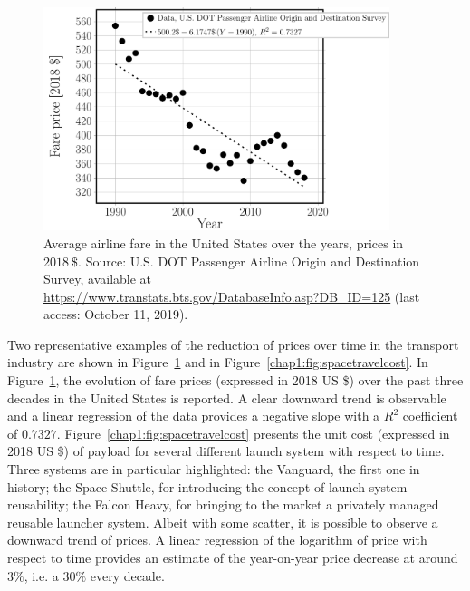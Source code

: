 \begin{description}
\begin{figure}[!h]
\includegraphics[width=0.9\textwidth]{pics/airlinefarecost.pdf}
\caption{Average airline fare in the United States over the years, prices in $2018\ \$$. Source: U.S. DOT Passenger Airline Origin and Destination Survey, available at \href{https://www.transtats.bts.gov/DatabaseInfo.asp?DB\_ID=125}{https://www.transtats.bts.gov/DatabaseInfo.asp?DB\_ID=125} (last access: October 11, 2019).}\label{chap1:fig:airlinefarecost}
\end{figure}

Two representative examples of the reduction of prices over time in the transport industry are shown in Figure~\ref{chap1:fig:airlinefarecost} and in Figure~\ref{chap1:fig:spacetravelcost}. In Figure~\ref{chap1:fig:airlinefarecost}, the evolution of fare prices (expressed in 2018 US \$) over the past three decades in the United States is reported. A clear downward trend is observable and a linear regression of the data provides a negative slope with a $R^{2}$ coefficient of $0.7327$. Figure~\ref{chap1:fig:spacetravelcost} presents the unit cost (expressed in 2018 US \$) of payload for several different launch system with respect to time. Three systems are in particular highlighted: the Vanguard, the first one in history; the Space Shuttle, for introducing the concept of launch system reusability; the Falcon Heavy, for bringing to the market a privately managed reusable launcher system. Albeit with some scatter, it is possible to observe a downward trend of prices. A linear regression of the logarithm of price with respect to time provides an estimate of the year-on-year price decrease at around $3\%$, i.e. a $30\%$ every decade.


\end{description}
